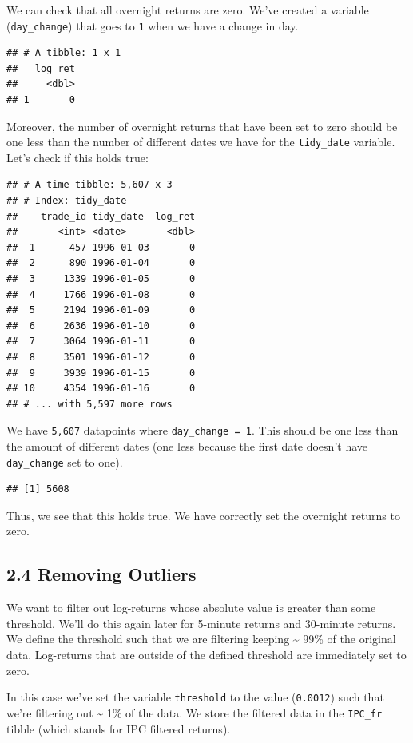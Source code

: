 \documentclass[]{elsarticle} %
\begin{document}
We can check that all overnight returns are zero. We've created a
variable (\texttt{day\_change}) that goes to \texttt{1} when we have a
change in day.

\begin{verbatim}
## # A tibble: 1 x 1
##   log_ret
##     <dbl>
## 1       0
\end{verbatim}

Moreover, the number of overnight returns that have been set to zero
should be one less than the number of different dates we have for the
\texttt{tidy\_date} variable. Let's check if this holds true:

\begin{verbatim}
## # A time tibble: 5,607 x 3
## # Index: tidy_date
##    trade_id tidy_date  log_ret
##       <int> <date>       <dbl>
##  1      457 1996-01-03       0
##  2      890 1996-01-04       0
##  3     1339 1996-01-05       0
##  4     1766 1996-01-08       0
##  5     2194 1996-01-09       0
##  6     2636 1996-01-10       0
##  7     3064 1996-01-11       0
##  8     3501 1996-01-12       0
##  9     3939 1996-01-15       0
## 10     4354 1996-01-16       0
## # ... with 5,597 more rows
\end{verbatim}

We have \texttt{5,607} datapoints where \texttt{day\_change\ =\ 1}. This
should be one less than the amount of different dates (one less because
the first date doesn't have \texttt{day\_change} set to one).

\begin{verbatim}
## [1] 5608
\end{verbatim}

Thus, we see that this holds true. We have correctly set the overnight
returns to zero.

\hypertarget{removing-outliers}{%
\subsection{2.4 Removing Outliers}\label{removing-outliers}}

We want to filter out log-returns whose absolute value is greater than
some threshold. We'll do this again later for 5-minute returns and
30-minute returns. We define the threshold such that we are filtering
keeping \textasciitilde{} 99\% of the original data. Log-returns that
are outside of the defined threshold are immediately set to zero.

In this case we've set the variable \texttt{threshold} to the value
(\texttt{0.0012}) such that we're filtering out \textasciitilde{} 1\% of
the data. We store the filtered data in the \texttt{IPC\_fr} tibble
(which stands for IPC filtered returns).
\end{document}
